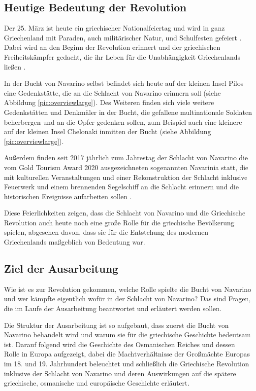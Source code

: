 \documentclass[preprint]{geomorphica} %
\begin{document}
\subsection{Heutige Bedeutung der Revolution}

Der 25. März ist heute ein griechischer Nationalfeiertag und wird in ganz Griechenland mit Paraden, auch militärischer Natur, und Schulfesten gefeiert \cite{MFA2023}.
Dabei wird an den Beginn der Revolution erinnert und der griechischen Freiheitskämpfer gedacht, die ihr Leben für die Unabhängigkeit Griechenlands ließen \cite{CarledgeVarnava2022}.

In der Bucht von Navarino selbst befindet sich heute auf der kleinen Insel Pilos eine Gedenkstätte, die an die Schlacht von Navarino erinnern soll (siehe Abbildung \ref{pic:overviewlarge}).
Des Weiteren finden sich viele weitere Gedenkstätten und Denkmäler in der Bucht, die gefallene multinationale Soldaten beherbergen und an die Opfer gedenken sollen, zum Beispiel auch eine kleinere auf der kleinen Insel Chelonaki inmitten der Bucht (siehe Abbildung \ref{pic:overviewlarge}).

Außerdem finden seit 2017 jährlich zum Jahrestag der Schlacht von Navarino die vom Gold Tourism Award 2020 ausgezeichneten sogenannten Navarinia statt, die mit kulturellen Veranstaltungen und einer Rekonstruktion der Schlacht inklusive Feuerwerk und einem brennenden Segelschiff an die Schlacht erinnern und die historischen Ereignisse aufarbeiten sollen \cite{Navarinia2023}.

Diese Feierlichkeiten zeigen, dass die Schlacht von Navarino und die Griechische Revolution auch heute noch eine große Rolle für die griechische Bevölkerung spielen, abgesehen davon, dass sie für die Entstehung des modernen Griechenlands maßgeblich von Bedeutung war.

\subsection{Ziel der Ausarbeitung}

Wie ist es zur Revolution gekommen, welche Rolle spielte die Bucht von Navarino und wer kämpfte eigentlich wofür in der Schlacht von Navarino?
Das sind Fragen, die im Laufe der Ausarbeitung beantwortet und erläutert werden sollen.

Die Struktur der Ausarbeitung ist so aufgebaut, dass zuerst die Bucht von Navarino behandelt wird und warum sie für die griechische Geschichte bedeutsam ist.
Darauf folgend wird die Geschichte des Osmanischen Reiches und dessen Rolle in Europa aufgezeigt, dabei die Machtverhältnisse der Großmächte Europas im 18. und 19. Jahrhundert beleuchtet und schließlich die Griechische Revolution inklusive der Schlacht von Navarino und deren Auswirkungen auf die spätere griechische, osmanische und europäische Geschichte erläutert.
\end{document}
